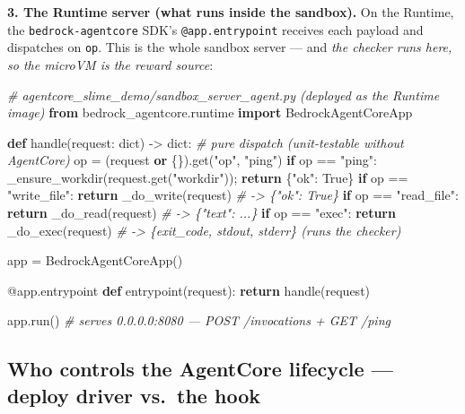 \documentclass[
  paper=a4,
  ,captions=tableheading
]{scrartcl}
\newenvironment{Shaded}{}{}
\newcommand{\AttributeTok}[1]{\textcolor[rgb]{0.49,0.56,0.16}{#1}}
\newcommand{\BuiltInTok}[1]{\textcolor[rgb]{0.00,0.50,0.00}{#1}}
\newcommand{\CommentTok}[1]{\textcolor[rgb]{0.38,0.63,0.69}{\textit{#1}}}
\newcommand{\ControlFlowTok}[1]{\textcolor[rgb]{0.00,0.44,0.13}{\textbf{#1}}}
\newcommand{\ImportTok}[1]{\textcolor[rgb]{0.00,0.50,0.00}{\textbf{#1}}}
\newcommand{\KeywordTok}[1]{\textcolor[rgb]{0.00,0.44,0.13}{\textbf{#1}}}
\newcommand{\NormalTok}[1]{#1}
\newcommand{\OperatorTok}[1]{\textcolor[rgb]{0.40,0.40,0.40}{#1}}
\newcommand{\StringTok}[1]{\textcolor[rgb]{0.25,0.44,0.63}{#1}}
\newcommand{\VariableTok}[1]{\textcolor[rgb]{0.10,0.09,0.49}{#1}}
\begin{document}
\textbf{3. The Runtime server (what runs inside the sandbox).} On the
Runtime, the \texttt{bedrock-agentcore} SDK's \texttt{@app.entrypoint}
receives each payload and dispatches on \texttt{op}. This is the whole
sandbox server --- and \emph{the checker runs here, so the microVM is
the reward source}:

\begin{Shaded}
\begin{Highlighting}[]
\CommentTok{\# agentcore\_slime\_demo/sandbox\_server\_agent.py  (deployed as the Runtime image)}
\ImportTok{from}\NormalTok{ bedrock\_agentcore.runtime }\ImportTok{import}\NormalTok{ BedrockAgentCoreApp}

\KeywordTok{def}\NormalTok{ handle(request: }\BuiltInTok{dict}\NormalTok{) }\OperatorTok{{-}\textgreater{}} \BuiltInTok{dict}\NormalTok{:              }\CommentTok{\# pure dispatch (unit{-}testable without AgentCore)}
\NormalTok{    op }\OperatorTok{=}\NormalTok{ (request }\KeywordTok{or}\NormalTok{ \{\}).get(}\StringTok{"op"}\NormalTok{, }\StringTok{"ping"}\NormalTok{)}
    \ControlFlowTok{if}\NormalTok{ op }\OperatorTok{==} \StringTok{"ping"}\NormalTok{:       \_ensure\_workdir(request.get(}\StringTok{"workdir"}\NormalTok{))}\OperatorTok{;} \ControlFlowTok{return}\NormalTok{ \{}\StringTok{"ok"}\NormalTok{: }\VariableTok{True}\NormalTok{\}}
    \ControlFlowTok{if}\NormalTok{ op }\OperatorTok{==} \StringTok{"write\_file"}\NormalTok{: }\ControlFlowTok{return}\NormalTok{ \_do\_write(request)     }\CommentTok{\# {-}\textgreater{} \{"ok": True\}}
    \ControlFlowTok{if}\NormalTok{ op }\OperatorTok{==} \StringTok{"read\_file"}\NormalTok{:  }\ControlFlowTok{return}\NormalTok{ \_do\_read(request)      }\CommentTok{\# {-}\textgreater{} \{"text": ...\}}
    \ControlFlowTok{if}\NormalTok{ op }\OperatorTok{==} \StringTok{"exec"}\NormalTok{:       }\ControlFlowTok{return}\NormalTok{ \_do\_exec(request)      }\CommentTok{\# {-}\textgreater{} \{exit\_code, stdout, stderr\}  (runs the checker)}

\NormalTok{app }\OperatorTok{=}\NormalTok{ BedrockAgentCoreApp()}

\AttributeTok{@app.entrypoint}
\KeywordTok{def}\NormalTok{ entrypoint(request):}
    \ControlFlowTok{return}\NormalTok{ handle(request)}

\NormalTok{app.run()      }\CommentTok{\# serves 0.0.0.0:8080 — POST /invocations + GET /ping}
\end{Highlighting}
\end{Shaded}

\hypertarget{who-controls-the-agentcore-lifecycle-deploy-driver-vs.-the-hook}{%
\subsection{Who controls the AgentCore lifecycle --- deploy driver
vs.~the
hook}\label{who-controls-the-agentcore-lifecycle-deploy-driver-vs.-the-hook}}
\end{document}
